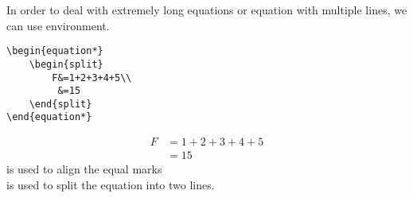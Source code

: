 \begin{frame}[fragile]
In order to deal with extremely long equations or equation with multiple lines, we can use  environment.
	\begin{example}
		\begin{verbatim}
\begin{equation*}
    \begin{split}
        F&=1+2+3+4+5\\
         &=15
    \end{split}
\end{equation*}
		\end{verbatim}
	\end{example}
	\begin{equation*}
    	\begin{split}
        	F&=1+2+3+4+5\\
         	 &=15
    	\end{split}
	\end{equation*}
	\structure{\&} is used to align the equal marks
	\\\LC{\\} is used to split the equation into two lines. 
\end{frame}

